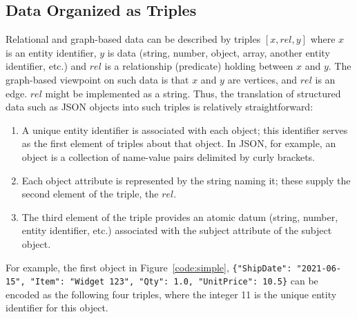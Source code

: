 \documentclass[9pt,letterpaper]{article}
\newcommand{\stt}[1]{\texttt{#1}}
\begin{document}
\subsection{Data Organized as Triples}
Relational and graph-based data can be described by triples $[x,rel,y]$ where $x$ is an entity identifier, $y$ is data (string, number, object, array, another entity identifier, etc.)%
and $rel$ is a relationship (predicate) holding between $x$ and $y$.
The graph-based viewpoint on such data is that $x$ and $y$ are vertices, and $rel$ is an edge.
$rel$ might be implemented as a string.
Thus, the translation of structured data such as JSON objects into such triples is relatively straightforward:
\begin{enumerate}
\item A unique entity identifier is associated with each object; this identifier serves as the first element of triples about that object.
      In JSON, for example, an object is a collection of name-value pairs delimited by curly brackets.
    \item Each object attribute is represented by the string naming it;%
      these supply the second element of the triple, the $rel$.
\item The third element of the triple provides an atomic datum (string, number, entity identifier, etc.) associated with the subject attribute of the subject object.
\end{enumerate}

For example, the first object in Figure~\ref{code:simple}, \stt{\{"ShipDate":  "2021-06-15", "Item":  "Widget 123", "Qty": 1.0, "UnitPrice": 10.5\}} can be encoded as
the following four triples, where the integer 11 is the unique entity identifier for this object.
\end{document}

